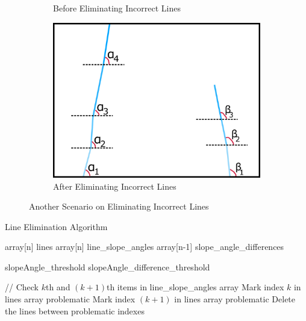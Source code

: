 \documentclass[a4paper,12pt]{article}
\begin{document}
\begin{enumerate}
\begin{figure}[h!]
\begin{subfigure}{.46\textwidth}
		\caption{\label{fig:dataP_explained3} Before Eliminating Incorrect Lines}
	\end{subfigure}%
	\begin{subfigure}{.46\textwidth}
		\centering
		\includegraphics[width=0.44\unitlength]{images/dataP_explained4}
		\caption{\label{fig:dataP_explained4} After Eliminating Incorrect Lines}
	\end{subfigure}
	\caption{\label{fig:dataP_explainedBroken} Another Scenario on Eliminating Incorrect Lines}
\end{figure}
\begin{algorithm}[H]
	\caption{Line Elimination Algorithm}
	\label{algo:eliminateLines}
	\DontPrintSemicolon
	
	array[n] lines \;
	array[n] line\_slope\_angles \;
	array[n-1] slope\_angle\_differences \;
	
	slopeAngle\_threshold \;
	slopeAngle\_difference\_threshold \;
	
	{ 
		{
			// Check $k$th and $(k+1)$th items in line\_slope\_angles array \;
			{
				Mark index $k$ in lines array problematic
			}	
			{
				Mark index $(k+1)$ in lines array problematic
			}	
		}
	}
	Delete the lines between problematic indexes \;
	
\end{algorithm}




\end{enumerate}
\end{document}
